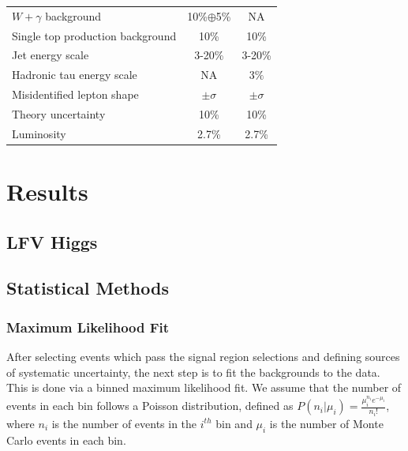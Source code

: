 \begin{table}[t]
{\begin{tabular}{l|c|c}
$W +\gamma$ background                               &              10\%$\oplus$5\%          &   NA    \\
Single top production background                       &               10\%         &   10\%   \\ \hline  \hline
Jet energy scale                                       &        3-20\%             &   3-20\% \\
Hadronic tau energy scale                              &        NA             &  3$\%$ \\
Misidentified lepton shape                             &        $\pm\sigma$              &  $\pm\sigma$  \\ \hline  \hline
Theory uncertainty                                     &              10\%          &    10\%  \\ \hline \hline
Luminosity                                             &              2.7\%          &    2.7\%  \\ \hline
  \end{tabular}
}
\end{table}




\chapter{Results}
\section{LFV Higgs}
\section{Statistical Methods}
\subsection{Maximum Likelihood Fit}
\qquad After selecting events which pass the signal region selections and defining sources of systematic uncertainty, the next step is to fit the backgrounds to the data. This is done via a binned maximum likelihood fit.\cite{BevingtonRobinson200207}\cite{Conway:2011in} We assume that the number of events in each bin follows a Poisson distribution, defined as $P(n_{i}|\mu_{i}) = \frac{\mu_{i}^{n_{i}}e^{-\mu_{i}}}{n_{i}!}$, where $n_{i}$ is the number of events in the $i^{th}$ bin and $\mu_{i}$ is the number of Monte Carlo events in each bin. 

